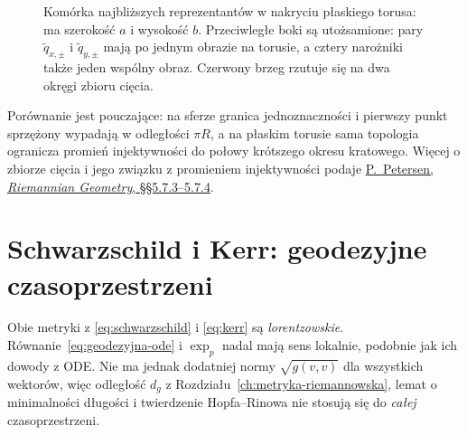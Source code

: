 \begin{figure}[htbp]
\centering
{}
\caption{Komórka najbliższych reprezentantów w nakryciu
płaskiego torusa: ma szerokość $a$ i wysokość $b$.
Przeciwległe boki są utożsamione:
pary $\widetilde q_{x,\pm}$ i $\widetilde q_{y,\pm}$
mają po jednym obrazie na torusie,
a cztery narożniki także jeden wspólny obraz.
Czerwony brzeg rzutuje się na dwa okręgi zbioru cięcia.}
\label{fig:ciecie-torus}
\end{figure}

Porównanie jest pouczające: na sferze granica
jednoznaczności i pierwszy punkt sprzężony wypadają
w odległości $\pi R$, a na płaskim torusie sama
topologia ogranicza promień injektywności
do połowy krótszego okresu kratowego.
Więcej o zbiorze cięcia i jego związku
z promieniem injektywności podaje
\href{https://www.math.ucla.edu/~petersen/RG.pdf}
{P.~Petersen, \emph{Riemannian Geometry}, \S\S5.7.3--5.7.4}.

\section{Schwarzschild i Kerr: geodezyjne czasoprzestrzeni}
\label{sec:geodezyjne-schwarzschild-kerr}

Obie metryki z \eqref{eq:schwarzschild} i
\eqref{eq:kerr} są \emph{lorentzowskie}.
Równanie~\eqref{eq:geodezyjna-ode} i $\exp_p$
nadal mają sens lokalnie, podobnie jak ich
dowody z ODE. Nie ma jednak dodatniej normy
$\sqrt{g(v,v)}$ dla wszystkich wektorów,
więc odległość $d_g$ z Rozdziału~\ref{ch:metryka-riemannowska},
lemat o minimalności długości i twierdzenie
Hopfa--Rinowa nie stosują się do \emph{całej}
czasoprzestrzeni.

